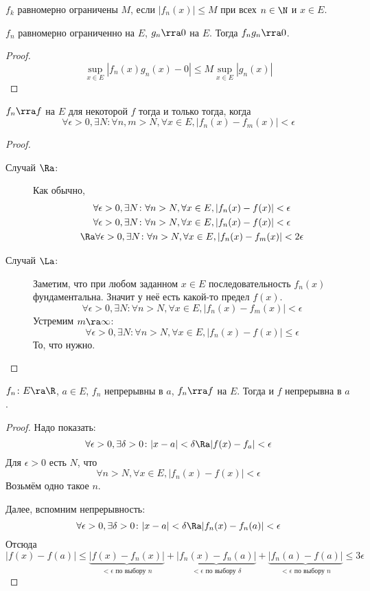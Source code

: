 \begin{Def}
	$f_k$ равномерно ограничены $M$, если $|f_n(x)| \le M$ при всех $n \in \N$ и $x \in E$.
\end{Def}

\begin{theorem}
	$f_n$ равномерно ограниченно на $E$, $g_n \rra 0$ на $E$.
	Тогда $f_ng_n \rra 0$.
\end{theorem}
\begin{proof}
	\[ \sup_{x \in E} |f_n(x)g_n(x) - 0| \le M \sup_{x \in E} |g_n(x)| \]
\end{proof}

\begin{theorem}
	$f_n \rra f$ на $E$ для некоторой $f$ тогда и только тогда, когда
	\[ \forall \epsilon > 0, \exists N\colon \forall n,m > N, \forall x \in E, |f_n(x) - f_m(x)| < \epsilon \]
\end{theorem}
\begin{proof}
	\begin{description}
	\item[Случай $\Ra$:]
		Как обычно,
		\begin{gather*}
			\forall \epsilon > 0, \exists N\colon \forall n > N, \forall x \in E, |f_n(x) - f(x)| < \epsilon \\
			\forall \epsilon > 0, \exists N\colon \forall n > N, \forall x \in E, |f_n(x) - f(x)| < \epsilon \\
			\Ra \forall \epsilon > 0, \exists N\colon \forall n > N, \forall x \in E, |f_n(x) - f_m(x)| < 2\epsilon
		\end{gather*}

	\item[Случай $\La$:]
		Заметим, что при любом заданном $x \in E$ последовательность $f_n(x)$ фундаментальна.
		Значит у неё есть какой-то предел $f(x)$.
		\[
			\forall \epsilon > 0, \exists N\colon \forall n > N, \forall x \in E, |f_n(x) - f_m(x)| < \epsilon
		\]
		Устремим $m \ra \infty$:
		\[
			\forall \epsilon > 0, \exists N\colon \forall n > N, \forall x \in E, |f_n(x) - f(x)| \le \epsilon
		\]
		То, что нужно.
	\end{description}
\end{proof}

\begin{theorem}
	$f_n\colon E \ra \R$, $a \in E$, $f_n$ непрерывны в $a$, $f_n \rra f$ на $E$.
	Тогда и $f$ непрерывна в $a$.
\end{theorem}
\begin{proof}
	Надо показать:
	\[ \forall \epsilon > 0, \exists \delta > 0\colon |x - a| < \delta \Ra |f(x) - f_a| < \epsilon \]
	Для $\epsilon > 0$ есть $N$, что
	\[ \forall n > N, \forall x \in E, |f_n(x) - f(x)| < \epsilon \]
	Возьмём одно такое $n$.

	Далее, вспомним непрерывность:
	\[ \forall \epsilon > 0, \exists \delta > 0\colon |x - a| < \delta \Ra |f_n(x) - f_n(a)| < \epsilon \]
	Отсюда
	\[
		|f(x) - f(a)|
		\le \underbrace{|f(x) - f_n(x)|}_{\text{$<\epsilon$ по выбору $n$}}
		+ \underbrace{|f_n(x) - f_n(a)|}_{\text{$<\epsilon$ по выбору $\delta$}}
		+ \underbrace{|f_n(a) - f(a)|}_{\text{$<\epsilon$ по выбору $n$}}
		\le 3\epsilon
	\]
\end{proof}

